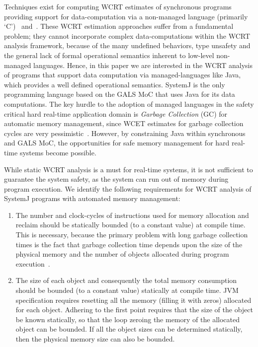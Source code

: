Techniques exist for computing WCRT estimates of synchronous programs
providing support for data-computation via a non-managed language
(primarily `C')~\cite{boldt07} and~\cite{proop10}. These WCRT estimation
approaches suffer from a fundamental problem; they cannot incorporate
complex data-computations within the WCRT analysis framework, because of
the many undefined behaviors, type unsafety and the general lack of
formal operational semantics inherent to low-level non-managed
languages. Hence, in this paper we are interested in the WCRT analysis
of programs that support data computation via managed-languages like
Java, which provides a well defined operational semantics.
{\color{black} SystemJ is the only programming language based on the
  GALS MoC that uses Java for its data computations.} The key hurdle to
the adoption of managed languages in the safety critical hard real-time
application domain is \textit{Garbage Collection} (GC) for automatic
memory management, since WCET estimates for garbage collection cycles
are very pessimistic~\cite{puffitsch2013design}. However, by
constraining Java within synchronous and GALS MoC, the opportunities for
safe memory management for hard real-time systems become possible.

{\color{black}

  While static WCRT analysis is a must for real-time systems, it is not
  sufficient to guarantee the system safety, as the system can run out
  of memory during program execution. We identify the following
  requirements for WCRT analysis of SystemJ programs with automated
  memory management:

  \begin{enumerate}

  \item The number and clock-cycles of instructions used for memory
    allocation and reclaim should be statically bounded (to a constant
    value) at compile time. This is necessary, because the primary
    problem with long garbage collection times is the fact that garbage
    collection time depends upon the size of the physical memory and the
    number of objects allocated during program
    execution~\cite{schoeberl2010scheduling}.

  \item The size of each object and consequently the total memory
    consumption should be bounded (to a constant value) statically at
    compile time. JVM specification requires resetting all the memory
    (filling it with zeros) allocated for each object. Adhering to the
    first point requires that the size of the object be known
    statically, so that the loop zeroing the memory of the allocated
    object can be bounded. If all the object sizes can be determined
    statically, then the physical memory size can also be bounded.

  \end{enumerate}

}

